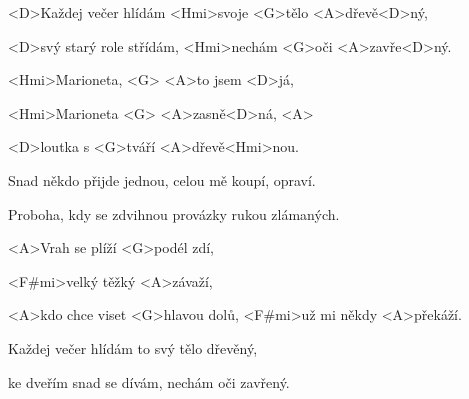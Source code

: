
\zs
<D>Každej večer hlídám
<Hmi>svoje <G>tělo <A>dřevě<D>ný,

<D>svý starý role střídám,
<Hmi>nechám <G>oči <A>zavře<D>ný.
\ks

\zr
<Hmi>Marioneta, <G> <A>to jsem <D>já,

<Hmi>Marioneta <G> <A>zasně<D>ná, <A>

<D>loutka s <G>tváří <A>dřevě<Hmi>nou.
\kr


\zs
Snad někdo přijde jednou,
celou mě koupí, opraví.

Proboha, kdy se zdvihnou
provázky rukou zlámaných.
\ks

\zr
\kr

\zs
<A>Vrah se plíží <G>podél zdí,

<F#mi>velký těžký <A>závaží,

<A>kdo chce viset <G>hlavou dolů,
<F#mi>už mi někdy <A>překáží.
\ks

\zs
Každej večer hlídám
to svý tělo dřevěný,

ke dveřím snad se dívám,
nechám oči zavřený.
\ks


\zr \kr
\kp
